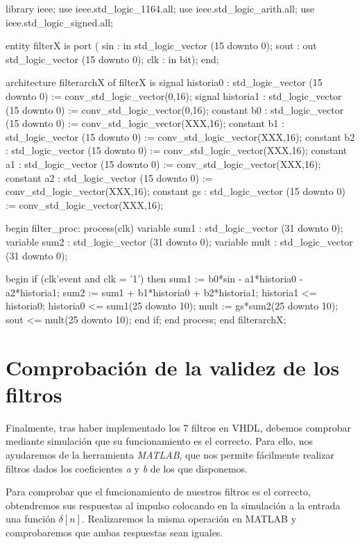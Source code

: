 \documentclass[a4paper,12pt]{article}
\begin{document}
\begin{vhdlcode}
library ieee;
use ieee.std_logic_1164.all;
use ieee.std_logic_arith.all;
use ieee.std_logic_signed.all;

entity filterX is
port (
    sin : in std_logic_vector (15 downto 0);
    sout : out std_logic_vector (15 downto 0);
    clk : in bit);
end;

architecture filterarchX of filterX is
    signal historia0 : std_logic_vector (15 downto 0) 
                := conv_std_logic_vector(0,16);
    signal historia1 : std_logic_vector (15 downto 0) 
                := conv_std_logic_vector(0,16);
    constant b0 : std_logic_vector (15 downto 0) 
                := conv_std_logic_vector(XXX,16);
    constant b1 : std_logic_vector (15 downto 0) 
                := conv_std_logic_vector(XXX,16);
    constant b2 : std_logic_vector (15 downto 0) 
                := conv_std_logic_vector(XXX,16);
    constant a1 : std_logic_vector (15 downto 0) 
                := conv_std_logic_vector(XXX,16);
    constant a2 : std_logic_vector (15 downto 0) 
                := conv_std_logic_vector(XXX,16);
    constant gs : std_logic_vector (15 downto 0) 
                := conv_std_logic_vector(XXX,16);

begin
    filter_proc: process(clk)
        variable sum1 : std_logic_vector (31 downto 0);
        variable sum2 : std_logic_vector (31 downto 0);
        variable mult : std_logic_vector (31 downto 0);

    begin
        if (clk'event and clk = '1') then
            sum1 := b0*sin - a1*historia0 - a2*historia1;
            sum2 := sum1 + b1*historia0 + b2*historia1;
            historia1 <= historia0;
            historia0 <= sum1(25 downto 10);
            mult := gs*sum2(25 downto 10);
            sout <= mult(25 downto 10);
        end if;
    end process;
end filterarchX;
\end{vhdlcode}
\clearpage

\section{Comprobación de la validez de los filtros}
Finalmente, tras haber implementado los 7 filtros en VHDL, debemos comprobar mediante simulación que su funcionamiento es el correcto. Para ello, nos ayudaremos de la herramienta \emph{MATLAB}, que nos permite fácilmente realizar filtros dados los coeficientes \emph{a} y \emph{b} de los que disponemos.

Para comprobar que el funcionamiento de nuestros filtros es el correcto, obtendremos sus respuestas al impulso colocando en la simulación a la entrada una función $\delta[n]$. Realizaremos la misma operación en MATLAB y comprobaremos que ambas respuestas sean iguales.
\end{document}
